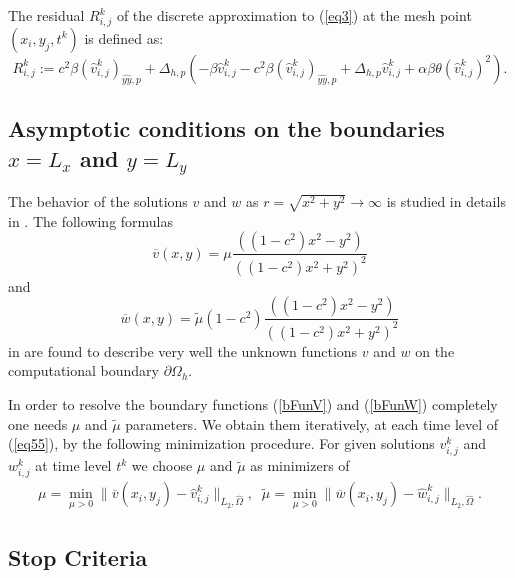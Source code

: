 \documentclass[preprint]{elsarticle}
\newcommand{\rf}[1]{(\ref{#1})}
\newcommand{\dO}{\partial\Omega_{h}}
\def\bar#1{{\overline{#1}}}
\begin{document}
The residual $R^k_{i,j}$ of the discrete approximation to \rf{eq3} at the mesh point $(x_i,y_j,t^k)$ is defined as:
\begin{equation}\label{residual}
R_{i,j}^k := 
c^2\beta (\widehat{v}^k_{i,j})_{\widehat{yy},p} + \Delta_{h,p}(-\beta \widehat{v}^k_{i,j} - c^2\beta (\widehat{v}^k_{i,j})_{\widehat{yy},p} + \Delta_{h,p} \widehat{v}^k_{i,j} 
+ \alpha \beta \theta (\widehat{v}^k_{i,j})^2  ).
\end{equation}
 
\subsection{Asymptotic conditions on the  boundaries $x=L_x$ and $y=L_y$}

The behavior of the solutions $v$ and $w$  as $r =\sqrt{x^2 +y^2} \rightarrow \infty$ is studied in details in \cite{bnd,Ch2011,Ch2012}. The following formulas  
\begin{equation}\label{bFunV}
\bar{v}(x,y) = \mu \frac{( (1-c^2)x^2-y^2 )}{((1-c^2)x^2 + y^2)^2 }
\end{equation}
and
\begin{equation}\label{bFunW}
\bar{w}(x,y) =\tilde {\mu} (1-c^2) \frac{( (1-c^2)x^2-y^2 )}{((1-c^2)x^2 + y^2)^2 }
\end{equation}
in  \cite{bnd} are found to describe very well the unknown functions $v$ and $w$ on the computational boundary $\dO$. 

In order to resolve the boundary functions \rf{bFunV} and \rf{bFunW} completely one needs $\mu$ and $\tilde {\mu}$ parameters.
We obtain them iteratively, at each time level of \rf{eq55}, by the following minimization procedure. For  given solutions  $v^k_{i,j}$ and $ w^k_{i,j}$ at time level $t^k$ 
we choose $\mu$ and $\tilde {\mu}$ as minimizers of 
\begin{equation}\label{mu}
\begin{split}
\mu = \underset{\mu>0 }{\operatorname{min} } \| \bar{v}(x_i,y_j) - \widehat{v}^k_{i,j} \|_{L_2,\widehat{\Omega}},
\;\;
\tilde {\mu} = \underset{\mu>0 }{\operatorname{min} } \| \bar{w}(x_i,y_j) -\widehat{w}^k_{i,j} \|_{L_2,\widehat{\Omega}}.
\end{split}
\end{equation}
 
\subsection{Stop Criteria}
\end{document}
